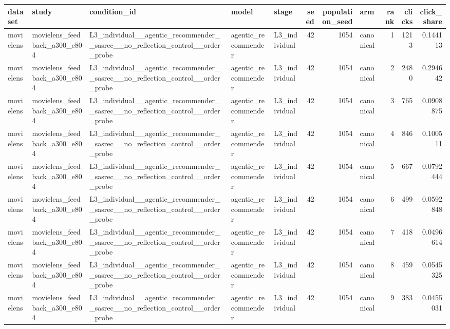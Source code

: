 \begin{table}[htbp!]
\centering
\small
\setlength{\tabcolsep}{3pt}
\renewcommand{\arraystretch}{1.1}
\begin{tabular}{lllllrrlrrr}
\hline
dataset & study & condition\_id & model & stage & seed & population\_seed & arm & rank & clicks & click\_share \\
\hline
movielens & movielens\_feedback\_a300\_e804 & L3\_individual\_\_agentic\_recommender\_\_sasrec\_\_no\_reflection\_control\_\_order\_probe & agentic\_recommender & L3\_individual & 42 & 1054 & canonical & 1 & 1213 & 0.144113 \\
movielens & movielens\_feedback\_a300\_e804 & L3\_individual\_\_agentic\_recommender\_\_sasrec\_\_no\_reflection\_control\_\_order\_probe & agentic\_recommender & L3\_individual & 42 & 1054 & canonical & 2 & 2480 & 0.294642 \\
movielens & movielens\_feedback\_a300\_e804 & L3\_individual\_\_agentic\_recommender\_\_sasrec\_\_no\_reflection\_control\_\_order\_probe & agentic\_recommender & L3\_individual & 42 & 1054 & canonical & 3 & 765 & 0.0908875 \\
movielens & movielens\_feedback\_a300\_e804 & L3\_individual\_\_agentic\_recommender\_\_sasrec\_\_no\_reflection\_control\_\_order\_probe & agentic\_recommender & L3\_individual & 42 & 1054 & canonical & 4 & 846 & 0.100511 \\
movielens & movielens\_feedback\_a300\_e804 & L3\_individual\_\_agentic\_recommender\_\_sasrec\_\_no\_reflection\_control\_\_order\_probe & agentic\_recommender & L3\_individual & 42 & 1054 & canonical & 5 & 667 & 0.0792444 \\
movielens & movielens\_feedback\_a300\_e804 & L3\_individual\_\_agentic\_recommender\_\_sasrec\_\_no\_reflection\_control\_\_order\_probe & agentic\_recommender & L3\_individual & 42 & 1054 & canonical & 6 & 499 & 0.0592848 \\
movielens & movielens\_feedback\_a300\_e804 & L3\_individual\_\_agentic\_recommender\_\_sasrec\_\_no\_reflection\_control\_\_order\_probe & agentic\_recommender & L3\_individual & 42 & 1054 & canonical & 7 & 418 & 0.0496614 \\
movielens & movielens\_feedback\_a300\_e804 & L3\_individual\_\_agentic\_recommender\_\_sasrec\_\_no\_reflection\_control\_\_order\_probe & agentic\_recommender & L3\_individual & 42 & 1054 & canonical & 8 & 459 & 0.0545325 \\
movielens & movielens\_feedback\_a300\_e804 & L3\_individual\_\_agentic\_recommender\_\_sasrec\_\_no\_reflection\_control\_\_order\_probe & agentic\_recommender & L3\_individual & 42 & 1054 & canonical & 9 & 383 & 0.0455031 \\

\end{tabular}
\end{table}
